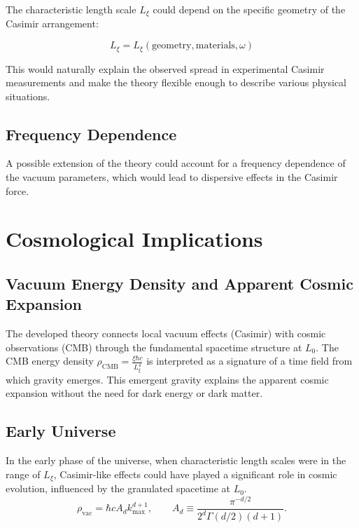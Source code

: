 	The characteristic length scale \( L_\xi \) could depend on the specific geometry of the Casimir arrangement:
	
	\begin{equation}
		L_\xi = L_\xi(\text{geometry}, \text{materials}, \omega) \label{eq:Lxi_dependencies}
	\end{equation}
	
	This would naturally explain the observed spread in experimental Casimir measurements and make the theory flexible enough to describe various physical situations.
	
	\subsection{Frequency Dependence}
	
	A possible extension of the theory could account for a frequency dependence of the vacuum parameters, which would lead to dispersive effects in the Casimir force.
	
	\section{Cosmological Implications}
	
	\subsection{Vacuum Energy Density and Apparent Cosmic Expansion}
	
	The developed theory connects local vacuum effects (Casimir) with cosmic observations (CMB) through the fundamental spacetime structure at \( L_0 \). The CMB energy density \( \rho_{\text{CMB}} = \frac{\xi \hbar c}{L_\xi^4} \) is interpreted as a signature of a time field from which gravity emerges. This emergent gravity explains the apparent cosmic expansion without the need for dark energy or dark matter.
	
	\subsection{Early Universe}
	
	In the early phase of the universe, when characteristic length scales were in the range of \( L_\xi \), Casimir-like effects could have played a significant role in cosmic evolution, influenced by the granulated spacetime at \( L_0 \).
	\begin{equation}	
		\rho_{\mathrm{vac}} = \hbar c  A_d  k_{\max}^{d+1},
		\qquad
		A_d \equiv \frac{\pi^{-d/2}}{2^d\Gamma(d/2)(d+1)}.
	\end{equation}
	
